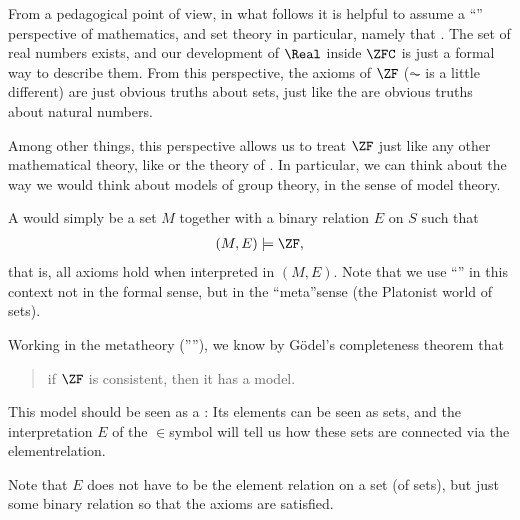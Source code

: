 \documentclass[letterpaper,10pt,english]{jupyterBook}
\begin{document}
\sphinxAtStartPar
From a pedagogical point of view, in what follows it is helpful to assume a “” perspective of mathematics, and set theory in particular, namely that . The set of real numbers exists, and our development of \(\Real\) inside \(\ZFC\) is just a formal way to describe them. From this perspective, the axioms of \(\ZF\) (\(\AC\) is a little different) are just obvious truths about sets, just like the  are obvious truths about natural numbers.

\sphinxAtStartPar
Among other things, this perspective allows us to treat \(\ZF\) just like any other mathematical theory, like  or the theory of .
In particular, we can think about  the way we would think about models of group theory, in the sense of model theory.

\sphinxAtStartPar
A  would simply be a set \(M\) together with a binary relation \(E\) on \(S\) such that
\begin{equation*}
\begin{split}
    (M,E) \models \ZF,
\end{split}
\end{equation*}
\sphinxAtStartPar
that is, all axioms hold when interpreted in \((M,E)\). Note that we use “” in this context not in the formal sense, but in the “meta”\sphinxhyphen{}sense (the Platonist world of sets).

\sphinxAtStartPar
Working in the meta\sphinxhyphen{}theory (””), we know by Gödel’s completeness theorem that
\begin{quote}

\sphinxAtStartPar
if \(\ZF\) is consistent, then it has a model.
\end{quote}

\sphinxAtStartPar
This model should be seen as a : Its elements can be seen as sets, and the interpretation  \(E\) of the \(\in\)\sphinxhyphen{}symbol will tell us how these sets are connected via the element\sphinxhyphen{}relation.

\sphinxAtStartPar
Note that \(E\) does not have to be the  element relation on a set (of sets), but just some binary relation so that the axioms are satisfied.
\end{document}
